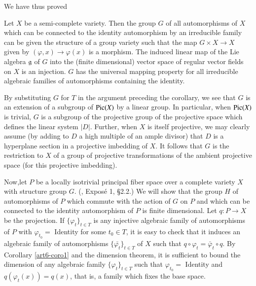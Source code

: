 We have thus proved

\begin{corollary}\label{art6-coro1}%
Let $X$ be a semi-complete variety. Then the group $G$ of all automorphisms of $X$ which can be connected to the identity automorphism by an irreducible family can be given the structure of a group variety such that the map $G \times X \to X$ given by $(\varphi, x) \to \varphi (x)$ is a morphism. The induced linear map of the Lie algebra $\mathfrak{g}$ of $G$ into the (finite dimensional) vector space of regular vector fields on $X$ is an injection. $G$ has the universal mapping property for all irreducible algebraic families of automorphisms containing the identity.
\end{corollary}

\begin{remark*}
By substituting $G$ for $T$ in the argument preceding the corollary, we see that $G$ is an extension of a subgroup of $\operatorname{Pic} (X)$ by a linear group. In particular, when $\operatorname{Pic} (X)$ is trivial, $G$ is a subgroup of the projective group of the projective space which defines the linear system $|D|$. Further, when $X$ is itself projective, we may clearly assume (by adding to $D$ a high multiple of an ample divisor) that $D$ is a hyperplane section in a projective imbedding of $X$. It follows that $G$ is the restriction to $X$ of a group of projective transformations of the ambient projective space (for this projective imbedding).
\end{remark*}

Now,\pageoriginale let $P$ be a locally isotrivial principal fiber space over a complete variety $X$ with structure group $G$. (\cite{art6-key6}, Expos\'e 1, \S 2.2.) We will show that the group $H$ of automorphisms of $P$ which commute with the action of $G$ on $P$ and which can be connected to the identity automorphism of $P$ is finite dimensional. Let $q: P \to X$ be the projection. If $\{\varphi_t\}_{t \in T}$ is any injective algebraic family of automorphisms of $P$ with $\varphi_{t_0} = $ Identity for some $t_0\in T$, it is easy to check that it induces an algebraic family of automorphisms $\{\bar{\varphi_t}\}_{t \in T}$ of $X$ such that $q \circ \varphi_t = \bar{\varphi}_t \circ q$. By Corollary \ref{art6-coro1} and the dimension theorem, it is sufficient to bound the dimension of any algebraic family $\{\varphi_t\}_{t \in T}$ such that $\varphi_{t_0} = $ Identity and $q (\varphi_t (x)) = q(x)$, that is, a family which fixes the base space.

